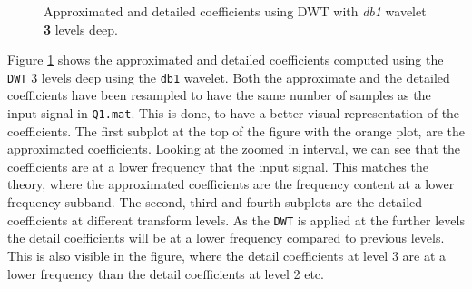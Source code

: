 \begin{figure}[H]
    \centering

    \caption{Approximated and detailed coefficients using DWT with \textit{db1} wavelet \textbf{3} levels deep. }
    \label{fig:problem1a}
\end{figure}

Figure \ref{fig:problem1a} shows the approximated and detailed coefficients computed using the \texttt{DWT} 3 levels deep using the \texttt{db1} wavelet. Both the approximate and the detailed coefficients have been resampled to have the same number of samples as the input signal in \texttt{Q1.mat}. This is done, to have a better visual representation of the coefficients. The first subplot at the top of the figure with the orange plot, are the approximated coefficients. Looking at the zoomed in interval, we can see that the coefficients are at a lower frequency that the input signal. This matches the theory, where the approximated coefficients are the frequency content at a lower frequency subband. The second, third and fourth subplots are the detailed coefficients at different transform levels. As the \texttt{DWT} is applied at the further levels the detail coefficients will be at a lower frequency compared to previous levels. This is also visible in the figure, where the detail coefficients at level 3 are at a lower frequency than the detail coefficients at level 2 etc.

